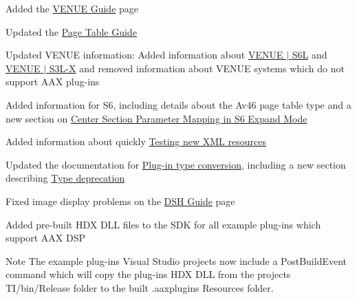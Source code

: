 \begin{DoxyItemize}
\item Added the \hyperlink{a00377}{V\+E\+N\+U\+E Guide} page 
\item Updated the \hyperlink{a00363}{Page Table Guide} 
\begin{DoxyItemize}
\item Updated V\+E\+N\+U\+E information\+: Added information about \hyperlink{a00363_subsubsection__venue_s6l}{V\+E\+N\+U\+E $\vert$ S6\+L} and \hyperlink{a00363_subsubsection__venue_s3l}{V\+E\+N\+U\+E $\vert$ S3\+L-\/\+X} and removed information about V\+E\+N\+U\+E systems which do not support A\+A\+X plug-\/ins 
\item Added information for S6, including details about the {\ttfamily \textquotesingle{}Av46\textquotesingle{}} page table type and a new section on \hyperlink{a00363_aax_page_table_guide_04_avid_center_section_page_tables_venue_s6_mapping}{Center Section Parameter Mapping in S6 Expand Mode} 
\item Added information about quickly \hyperlink{a00363_subsection_testing_xml_resources}{Testing new X\+M\+L resources} 
\end{DoxyItemize}
\item Updated the documentation for \hyperlink{a00356}{Plug-\/in type conversion}, including a new section describing \hyperlink{a00356_advancedTopics_relatedTypes_deprecation}{Type deprecation} 
\item Fixed image display problems on the \hyperlink{a00365}{D\+S\+H Guide} page 
\item Added pre-\/built H\+D\+X D\+L\+L files to the S\+D\+K for all example plug-\/ins which support A\+A\+X D\+S\+P \begin{DoxyNote}{Note}
The example plug-\/ins\textquotesingle{} Visual Studio projects now include a {\ttfamily Post\+Build\+Event} command which will copy the plug-\/in\textquotesingle{}s H\+D\+X D\+L\+L from the project\textquotesingle{}s T\+I/bin/\+Release folder to the built .aaxplugin\textquotesingle{}s Resources folder.  
\end{DoxyNote}


\end{DoxyItemize}
